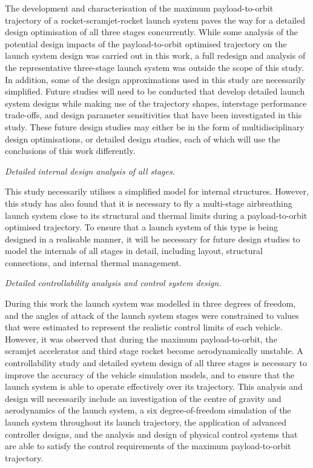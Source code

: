 \noindent
The development and characterisation of the maximum payload-to-orbit trajectory of a rocket-scramjet-rocket launch system paves the way for a detailed design optimisation of all three stages concurrently.
While some analysis of the potential design impacts of the payload-to-orbit optimised trajectory on the launch system design was carried out in this work, a full redesign and analysis of the representative three-stage launch system was outside the scope of this study. In addition, some of the design approximations used in this study are necessarily simplified. Future studies will need to be conducted that develop detailed launch system designs while making use of the trajectory shapes, interstage performance trade-offs, and design parameter sensitivities that have been investigated in this study. These future design studies may either be in the form of multidisciplinary design optimisations, or detailed design studies, each of which will use the conclusions of this work differently. 

\vspace{10pt}
\textit{Detailed internal design analysis of all stages.}

\noindent
This study necessarily utilises a simplified model for internal structures. However, this study has also found that it is necessary to fly a multi-stage airbreathing launch system close to its structural and thermal limits during a payload-to-orbit optimised trajectory. To ensure that a launch system of this type is being designed in a realisable manner, it will be necessary for future design studies to model the internals of all stages in detail, including layout, structural connections, and internal thermal management.  

\vspace{10pt}
	\textit{Detailed controllability analysis and control system design.}

\noindent
During this work the launch system was modelled in three degrees of freedom, and the angles of attack of the launch system stages were constrained to values that were estimated to represent the realistic control limits of each vehicle. However, it was observed that during the maximum payload-to-orbit, the scramjet accelerator and third stage rocket become aerodynamically unstable.
A controllability study and detailed system design of all three stages is necessary to improve the accuracy of the vehicle simulation models, and to ensure that the launch system is able to operate effectively over its trajectory. This analysis and design will necessarily include an investigation of the centre of gravity and aerodynamics of the launch system, a six degree-of-freedom simulation of the launch system throughout its launch trajectory, the application of advanced controller designs, and the analysis and design of physical control systems that are able to satisfy the control requirements of the maximum payload-to-orbit trajectory. 


